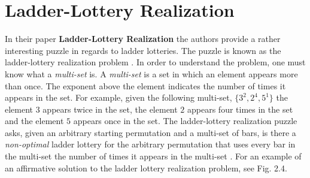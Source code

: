 

\section{Ladder-Lottery Realization}

In their paper \textbf{Ladder-Lottery Realization} the authors provide 
a rather interesting puzzle in regards to ladder lotteries. The puzzle 
is known as the ladder-lottery realization problem \cite{A3}. In order to understand
the problem, one must know what a \emph{multi-set} is. A \emph{multi-set}
is a set in which an element appears more than once. The exponent 
above the element indicates the number of times it appears in the set.
For example, given the following multi-set, $\{3^{2}, 2^{4}, 5^{1}\}$ 
the element $3$ appears twice in the set, the element $2$ appears four times
in the set and the element $5$ appears once in the set.
The ladder-lottery realization puzzle asks, given an arbitrary starting permutation 
and a multi-set of bars, 
is there a \emph{non-optimal} ladder lottery for the arbitrary permutation
that uses every bar in the multi-set the number 
of times it appears in the  multi-set \cite{A3}. 
For an example of an affirmative solution to the ladder lottery realization problem, see Fig. 2.4.


